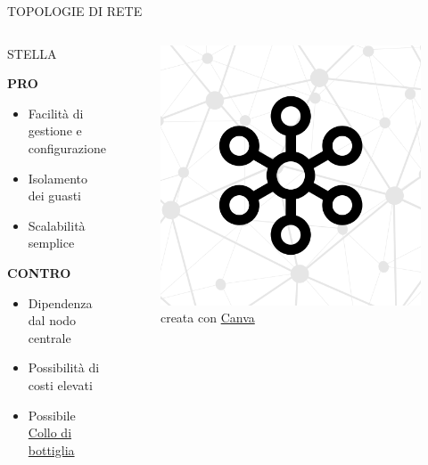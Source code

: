 \documentclass[aspectratio=1610]{beamer}
\begin{document}
\begin{frame}{TOPOLOGIE DI RETE}
    \begin{columns}
            \justifying
            \begin{alertblock}{STELLA}
                \begin{minipage}{0.96\linewidth}
                    \justifying
                    \textbf{PRO}
                    \begin{itemize}
                        \item Facilità di gestione e configurazione
                        \pause
                        \item Isolamento dei guasti
                        \pause
                        \item Scalabilità semplice
                    \end{itemize}
                    \pause
                    \textbf{CONTRO}
                    \begin{itemize}
                        \item Dipendenza dal nodo centrale
                        \pause
                        \item Possibilità di costi elevati
                        \pause
                        \item Possibile \href{https://it.wikipedia.org/wiki/Collo\_di\_bottiglia\_(ingegneria)}{Collo di bottiglia}
                    \end{itemize}
                \end{minipage}
            \end{alertblock}
            \begin{figure}
                \includegraphics[width=\linewidth]{img/stella.png}
                \caption{{creata con \href{https://www.canva.com/}{Canva}}}
            \end{figure}
    \end{columns}
\end{frame}
\end{document}
